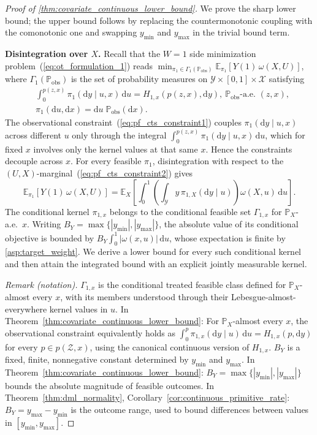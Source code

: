 \begin{proof}[Proof of \cref{thm:covariate_continuous_lower_bound}]
We prove the sharp lower bound; the upper bound follows by replacing the countermonotonic coupling with the comonotonic one and swapping $y_{\min}$ and $y_{\max}$ in the trivial bound term.

\medskip
\noindent\textbf{Disintegration over $X$.}
Recall that the $W=1$ side minimization problem~(\ref{eq:ot_formulation_1}) reads $\min_{\pi_1 \in \Gamma_1(\mathbb{P}_{\text{obs}})} \mathbb{E}_{\pi_1}[Y(1)\,\omega(X,U)]$, where $\Gamma_1(\mathbb{P}_{\text{obs}})$ is the set of probability measures on $\mathcal{Y} \times [0,1] \times \mathcal{X}$ satisfying
\begin{align}
    &\int_0^{p(z,x)} \pi_1(\mathrm{d}y \mid u, x)\,\mathrm{d}u = H_{1,x}(p(z,x),\mathrm{d}y),\ \mathbb{P}_{\text{obs}}\text{-a.e.\ } (z,x), \label{eq:pf_cts_constraint1} \\
    &\pi_1(\mathrm{d}u, \mathrm{d}x) = \mathrm{d}u\;\mathbb{P}_{\text{obs}}(\mathrm{d}x). \label{eq:pf_cts_constraint2}
\end{align}
The observational constraint~(\ref{eq:pf_cts_constraint1}) couples $\pi_1(\mathrm{d}y \mid u, x)$ across different $u$ only through the integral $\int_0^{p(z,x)} \pi_1(\mathrm{d}y \mid u, x)\,\mathrm{d}u$, which for fixed $x$ involves only the kernel values at that same $x$. Hence the constraints decouple across $x$. For every feasible $\pi_1$, disintegration with respect to the $(U,X)$-marginal~(\ref{eq:pf_cts_constraint2}) gives
\begin{equation}\label{eq:pf_cts_exchange}
    \mathbb{E}_{\pi_1}[Y(1)\,\omega(X,U)]
    =\mathbb E_X\left[\int_0^1\left(\int_{\mathcal Y}y\,\pi_{1,X}(\mathrm dy\mid u)\right)\omega(X,u)\,\mathrm du\right].
\end{equation}
The conditional kernel $\pi_{1,x}$ belongs to the conditional feasible set $\Gamma_{1,x}$ for $\mathbb P_X$-a.e.\ $x$. Writing $B_Y=\max\{|y_{\min}|,|y_{\max}|\}$, the absolute value of its conditional objective is bounded by $B_Y\int_0^1|\omega(x,u)|\,\mathrm du$, whose expectation is finite by \cref{asp:target_weight}. We derive a lower bound for every such conditional kernel and then attain the integrated bound with an explicit jointly measurable kernel.

\noindent\textit{Remark (notation).} $\Gamma_{1,x}$ is the conditional treated feasible class defined for $\mathbb P_X$-almost every $x$, with its members understood through their Lebesgue-almost-everywhere kernel values in $u$. In Theorem~\ref{thm:covariate_continuous_lower_bound}: For $\mathbb P_X$-almost every $x$, the observational constraint equivalently holds as $\int_0^p\pi_{1,x}(\mathrm dy\mid u)\,\mathrm du=H_{1,x}(p,\mathrm dy)$ for every $p\in p(\mathcal Z,x)$, using the canonical continuous version of $H_{1,x}$. $B_Y$ is a fixed, finite, nonnegative constant determined by $y_{\min}$ and $y_{\max}$. In Theorem~\ref{thm:covariate_continuous_lower_bound}: $B_Y=\max\{|y_{\min}|,|y_{\max}|\}$ bounds the absolute magnitude of feasible outcomes. In Theorem~\ref{thm:dml_normality}, Corollary~\ref{cor:continuous_primitive_rate}: $B_Y=y_{\max}-y_{\min}$ is the outcome range, used to bound differences between values in $[y_{\min},y_{\max}]$.



\end{proof}
